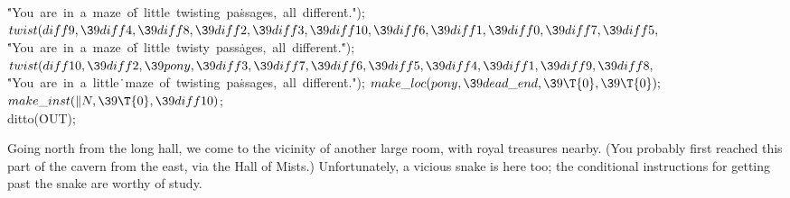 \6
\.{"You\ are\ in\ a\ maze\ o}\)\.{f\ little\ twisting\ pa}\)\.{ssages,\ all\
differen}\)\.{t."});\6
${}\\{twist}(\\{diff9},\39\\{diff4},\39\\{diff8},\39\\{diff2},\39\\{diff3},\39%
\\{diff10},\39\\{diff6},\39\\{diff1},\39\\{diff0},\39\\{diff7},\39\\{diff5},{}$%
\6
\.{"You\ are\ in\ a\ maze\ o}\)\.{f\ little\ twisty\ pass}\)\.{ages,\ all\
different.}\)\.{"});\6
${}\\{twist}(\\{diff10},\39\\{diff2},\39\\{pony},\39\\{diff3},\39\\{diff7},\39%
\\{diff6},\39\\{diff5},\39\\{diff4},\39\\{diff1},\39\\{diff9},\39\\{diff8},{}$\6
\.{"You\ are\ in\ a\ little}\)\.{\ maze\ of\ twisting\ pa}\)\.{ssages,\ all\
differen}\)\.{t."});\7
${}\\{make\_loc}(\\{pony},\39\\{dead\_end},\39\T{0},\39\T{0});{}$\6
${}\\{make\_inst}(\|N,\39\T{0},\39\\{diff10}){}$;\5
\\{ditto}(\.{OUT});\par
\fi

Going north from the long hall, we come to the vicinity of
another large
room, with royal treasures nearby. (You probably first reached this part of the
cavern from the east, via the Hall of Mists.) Unfortunately, a vicious snake
is here too; the conditional instructions for getting past the snake are
worthy of study.

